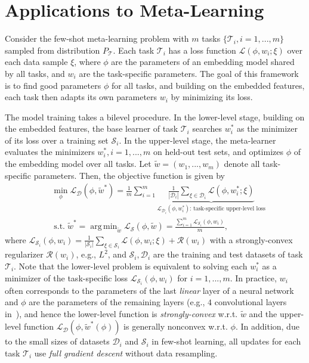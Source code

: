 \documentclass{osudissert96}
\def\gD{{\mathcal{D}}}
\def\gL{{\mathcal{L}}}
\def\gR{{\mathcal{R}}}
\def\gS{{\mathcal{S}}}
\def\gT{{\mathcal{T}}}
\DeclareMathOperator*{\argmin}{arg\,min}
\begin{document}
\section{Applications to Meta-Learning}
Consider the few-shot meta-learning problem with $m$ tasks $\{\mathcal{T}_i,i=1,...,m\}$
 sampled from distribution $P_\gT$. Each task $\mathcal{T}_i$ has a loss function $\gL(\phi,w_i;\xi)$ over each data sample $\xi$, where $\phi$ are the parameters of an embedding model shared by all tasks, and $w_i$ are the task-specific parameters. The goal of this framework is to  find good parameters $\phi$ for all tasks, and building on the embedded features, each task then adapts its own parameters $w_i$ by minimizing its loss.

The model training  takes a bilevel procedure. In the lower-level stage, building on the embedded features, the base learner of task $\mathcal{T}_i$ searches $w_i^*$ as the minimizer of its 
loss %
  over a training set $\gS_i$. In the upper-level stage, the meta-learner evaluates the minimizers $w_i^*,i=1,...,m$ on held-out test sets, and optimizes $\phi$ of the embedding model over all tasks. Let $\widetilde w=(w_1,...,w_m)$ denote all task-specific parameters. Then, the objective function is given by 
 \begin{align}\label{obj:meta}
 &\min_{\phi} \gL_{\gD} (\phi,\widetilde w^{*})=\frac{1}{m}\sum_{i=1}^m\underbrace{\frac{1}{|\gD_i|}\sum_{\xi\in\gD_i}\mathcal{L}(\phi,w_i^*;\xi)}_{\gL_{\gD_i}(\phi,w_i^*)\text{: task-specific upper-level loss}} \nonumber
 \\& \;\mbox{s.t.} \; \widetilde w^* = \argmin_{\widetilde w} \gL_{\gS} (\phi,\widetilde w)=\frac{\sum_{i=1}^m\gL_{\gS_i}(\phi,w_i)
 }{m},
 \end{align} %
 where $\gL_{\gS_i}(\phi,w_i)= \frac{1}{|\gS_i|}\sum_{\xi\in\gS_i}\mathcal{L}(\phi,w_i;\xi) + \gR(w_i)$ with a strongly-convex regularizer $\gR(w_i)$, e.g., $L^2$, and $\gS_i,\gD_i$ are the training and test datasets of task $\mathcal{T}_i$. Note that the lower-level problem is equivalent to solving each $w^*_i$ as a minimizer of the task-specific loss $\gL_{\gS_i}(\phi,w_i)$ for $i=1,...,m$.  In practice, $w_i$ often corresponds to the parameters of the last {\em linear} layer of a neural network and $\phi$ are the parameters of the remaining layers (e.g., $4$ convolutional layers in~\cite{bertinetto2018meta,ji2020convergence}), and hence the lower-level function is {\em strongly-convex} w.r.t. $\widetilde w$ and the upper-level function $\gL_{\gD} (\phi,\widetilde w^{*}(\phi))$ is generally nonconvex w.r.t. $\phi$. In addition, due to the small sizes of datasets $\gD_i$ and $\gS_i$ in few-shot learning, all updates for each task $\gT_i$ use {\em full gradient descent} without data resampling. 
\end{document}
